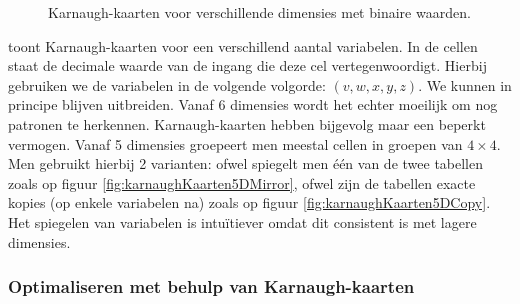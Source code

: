 \begin{figure}[hbt]
{}
\caption{Karnaugh-kaarten voor verschillende dimensies met binaire waarden.}
\label{fig:karnaughKaarten}
\end{figure}
toont Karnaugh-kaarten voor een verschillend aantal variabelen. In de cellen staat de decimale waarde van de ingang die deze cel vertegenwoordigt. Hierbij gebruiken we de variabelen in de volgende volgorde: $\left(v,w,x,y,z\right)$. We kunnen in principe blijven uitbreiden. Vanaf 6 dimensies wordt het echter moeilijk om nog patronen te herkennen. Karnaugh-kaarten hebben bijgevolg maar een beperkt vermogen. Vanaf 5 dimensies groepeert men meestal cellen in groepen van $4\times 4$. Men gebruikt hierbij 2 varianten: ofwel spiegelt men \'e\'en van de twee tabellen zoals op figuur \ref{fig:karnaughKaarten5DMirror}, ofwel zijn de tabellen exacte kopies (op enkele variabelen na) zoals op figuur \ref{fig:karnaughKaarten5DCopy}. Het spiegelen van variabelen is intu\"itiever omdat dit consistent is met lagere dimensies.
\subsubsection{Optimaliseren met behulp van Karnaugh-kaarten}

